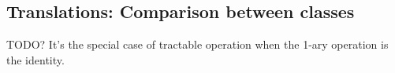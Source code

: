 \subsection{Translations: Comparison between classes}

TODO? It's the special case of tractable operation when the 1-ary operation is the identity.



